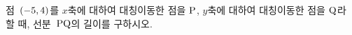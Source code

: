 점~$(-5{,}\mkern3mu\mathopen{}4)$를 $x$축에 대하여 대칭이동한 점을 $\mathrm{P}$, $y$축에 대하여 대칭이동한 점을 $\mathrm{Q}$라 할 때, 선분~$\mathrm{PQ}$의 길이를 구하시오.
